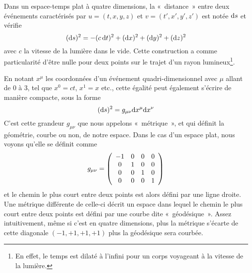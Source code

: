 \documentclass[../main/main.tex]{subfiles}
\begin{document}
Dans un espace-temps plat à quatre dimensions, la «~distance~» entre deux
événements caractérisés par $u=(t,x,y,z)$ et $v=(t',x',y',z')$ est notée $\mathrm{d} s$
et vérifie
\begin{equation}
    (\mathrm{d} s)^2 = -(c\,\mathrm{d} t)^2 + (\mathrm{d} x)^2 + (\mathrm{d} y)^2 + (\mathrm{d} z)^2
\end{equation}
avec $c$ la vitesse de la lumière dans le vide. Cette construction a comme
particularité d'être nulle pour deux points sur le trajet d'un rayon
lumineux\footnote{En effet, le temps est dilaté à l'infini pour un corps
voyageant à la vitesse de la lumière.}.

En notant $x^\mu$ les coordonnées d'un événement quadri-dimensionnel avec $\mu$
allant de 0 à 3, tel que $x^0 = ct$, $x^1 = x$ etc., cette égalité peut
également s'écrire de manière compacte, sous la forme
\begin{equation}
    (\mathrm{d} s)^2 = g_{\mu\nu}\mathrm{d} x^\mu \mathrm{d} x^\nu
\end{equation}
C'est cette grandeur $g_{\mu\nu}$ que nous appelons «~métrique~», et qui définit
la géométrie, courbe ou non, de notre espace. Dans le cas d'un espace plat, nous
voyons qu'elle se définit comme
\begin{equation}
    g_{\mu\nu} = \left(\begin{array}{c c c c}
            -1 & 0 & 0 & 0\\
            0 & 1 & 0 & 0\\
            0 & 0 & 1 & 0\\
            0 & 0 & 0 & 1\\
    \end{array}\right)
\end{equation}
et le chemin le plus court entre deux points est alors défini par une ligne
droite. Une métrique différente de celle-ci décrit un espace dans lequel le
chemin le plus court entre deux points est défini par une courbe dite
«~géodésique~». Assez intuitivement, même si c'est en quatre dimensions, plus la
métrique s'écarte de cette diagonale $(-1,+1,+1,+1)$ plus la géodésique sera
courbée.
\end{document}
